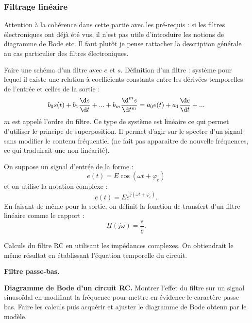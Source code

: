 \subsubsection{Filtrage linéaire}

\begin{remarque}
Attention à la cohérence dans cette partie avec les pré-requis : si les filtres électroniques ont déjà été vus, il n'est pas utile d'introduire les notions de diagramme de Bode etc.
Il faut plutôt je pense rattacher la description générale au cas particulier des filtres électroniques.
\end{remarque}

Faire une schéma d'un filtre avec $e$ et $s$.
Définition d'un filtre : système pour lequel il existe une relation à coefficients constants entre les dérivées temporelles de l'entrée et celles de la sortie :
\begin{equation}
b_0 s(t) + b_1 \frac{\d s}{\d t} + ... + b_m \frac{\d^m s}{\d t^m} = a_0 e(t) + a_1 \frac{\d e}{\d t}+ ...
\end{equation}
$m$ est appelé l'ordre du filtre.
Ce type de système est linéaire ce qui permet d'utiliser le principe de superposition.
Il permet d'agir sur le spectre d'un signal sans modifier le contenu fréquentiel (ne fait pas apparaitre de nouvelle fréquences, ce qui traduirait une non-linéarité).

On suppose un signal d'entrée de la forme :
\begin{equation}
e(t) = E\cos(\omega t+\varphi_e)
\end{equation}
et on utilise la notation complexe :
\begin{equation}
\underline{e}(t) = E e^{j(\omega t + \varphi_e)}.
\end{equation}
En faisant de même pour la sortie, on définit la fonction de transfert d'un filtre linéaire comme le rapport :
\begin{equation}
\underline{H}(j\omega) = \frac{\underline{s}}{\underline{e}}.
\end{equation}

Calculs du filtre RC en utilisant les impédances complexes.
On obtiendrait le même résultat en établissant l'équation temporelle du circuit.

\begin{slide}
\textbf{Filtre passe-bas.}
\end{slide}

\begin{experience}
\textbf{Diagramme de Bode d'un circuit RC.}
Montrer l'effet du filtre sur un signal sinusoïdal en modifiant la fréquence pour mettre en évidence le caractère passe bas.
Faire les calculs puis acquérir et ajuster le diagramme de Bode obtenu par le modèle.
\end{experience}

